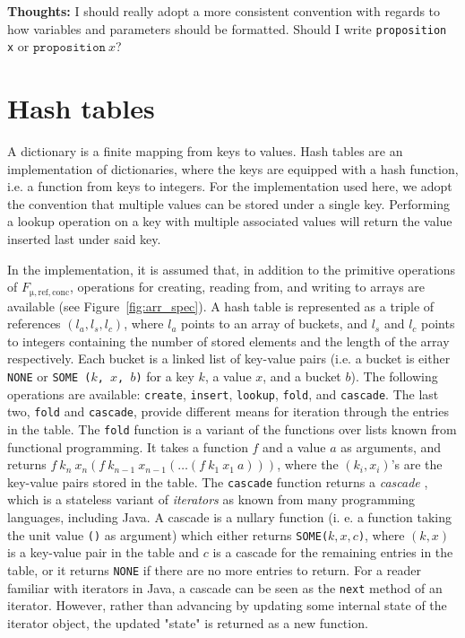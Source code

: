 \documentclass[10pt,a4paper]{article}
\renewcommand{\fcolorbox}[4][]{#4}}
\newcommand{\thoughts}[1]{\noindent\fcolorbox{black}{cyan}{\parbox{\textwidth}{\textbf{Thoughts:} \linebreak #1}}}
\begin{document}
\thoughts{I should really adopt a more consistent convention with regards to how variables and parameters should be formatted. Should I write \texttt{proposition x} or $\mathtt{proposition} \ x$?}
\section{Hash tables}
A dictionary is a finite mapping from keys to values. Hash tables are an implementation of dictionaries, where the keys are equipped with a hash function, i.e. a function from keys to integers. For the implementation used here, we adopt the convention that multiple values can be stored under a single key. Performing a lookup operation on a key with multiple associated values will return the value inserted last under said key.

In the implementation, it is assumed that, in addition to the primitive operations of $F_{\mathrm{\mu, ref, conc}}$, operations for creating, reading from, and writing to arrays are available (see Figure~\ref{fig:arr_spec}). A hash table is represented as a triple of references $(l_a, l_s, l_c)$, where $l_a$ points to an array of buckets, and $l_s$ and $l_c$ points to integers containing the number of stored elements and the length of the array respectively. Each bucket is a linked list of key-value pairs (i.e. a bucket is either \texttt{NONE} or \texttt{SOME ($k$, $x$, $b$)} for a key $k$, a value $x$, and a bucket $b$). The following operations are available: \texttt{create}, \texttt{insert}, \texttt{lookup}, \texttt{fold}, and \texttt{cascade}. The last two, \texttt{fold} and \texttt{cascade}, provide different means for iteration through the entries in the table. The \texttt{fold} function is a variant of the functions over lists known from functional programming. It takes a function $f$ and a value $a$ as arguments, and returns $f \ k_n \ x_n (f \ k_{n-1} \ x_{n-1} (\ldots (f \ k_1 \ x_1 \ a)))$, where the $(k_i, x_i)$'s are the key-value pairs stored in the table. The \texttt{cascade} function returns a \emph{cascade} \cite{pottier-cpp-17}, which is a stateless variant of \emph{iterators} \cite{Gamma:1995:DPE:186897} as known from many programming languages, including Java. A cascade is a nullary function (i. e. a function taking the unit value \texttt{()} as argument) which either returns \texttt{SOME($k,x,c$)}, where $(k,x)$ is a key-value pair in the table and $c$ is a cascade for the remaining entries in the table, or it returns \texttt{NONE} if there are no more entries to return. For a reader familiar with iterators in Java, a cascade can be seen as the \texttt{next} method of an iterator. However, rather than advancing by updating some internal state of the iterator object, the updated "state" is returned as a new function.
\end{document}
